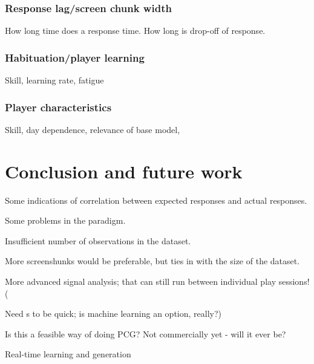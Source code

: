 \documentclass{llncs}
\begin{document}
\subsubsection{Response lag/screen chunk width}
How long time does a response time. How long is drop-off of response.
\subsubsection{Habituation/player learning}
Skill, learning rate, fatigue
\subsubsection{Player characteristics}
Skill, day dependence, relevance of base model, 

\section{Conclusion and future work}
Some indications of correlation between expected responses and actual responses.

Some problems in the paradigm.

Insufficient number of observations in the dataset.

More screenshunks would be preferable, but ties in with the size of the dataset.

More advanced signal analysis; that can still run between individual play sessions! (

Need s to be quick; is machine learning an option, really?)

Is this a feasible way of doing PCG? Not commercially yet - will it ever be?

Real-time learning and generation


\end{document}
